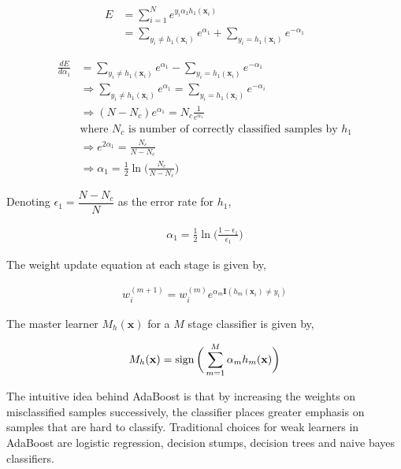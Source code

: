 \begin{align*}
E &= \sum_{i=1}^{N}e^{y_{i}\alpha_{1}h_{1}(\mathbf{x}_{i})}\\
&= \sum_{y_{i}\neq h_{1}(\mathbf{x}_{i})}e^{\alpha_{1}} + \sum_{y_{i} = h_{1}(\mathbf{x}_{i})}e^{-\alpha_{1}}
\end{align*}

\begin{align*}
\frac{dE}{d\alpha_{1}} &=  \sum_{y_{i}\neq h_{1}(\mathbf{x}_{i})}e^{\alpha_{1}} - \sum_{y_{i} = h_{1}(\mathbf{x}_{i})}e^{-\alpha_{1}} \\
&\Rightarrow \sum_{y_{i}\neq h_{1}(\mathbf{x}_{i})}e^{\alpha_{1}} = \sum_{y_{i} = h_{1}(\mathbf{x}_{i})}e^{-\alpha_{i}}\\
&\Rightarrow (N - N_{c})e^{\alpha_{1}} = N_{c}\frac{1}{e^{\alpha_{1}}}   \\
&\textrm{where $N_{c}$ is number of correctly classified samples by $h_{1}$}\\
&\Rightarrow e^{2\alpha_{1}} = \frac{N_{c}}{N - N_{c}}\\
&\Rightarrow \alpha_{1} = \frac{1}{2}\ln\bigg(\frac{N_{c}}{N-N_{c}}\bigg)
\end{align*}

Denoting $\epsilon_{1} = \dfrac{N - N_{c}}{N}$ as the error rate for $h_{1}$,

\begin{align}
\alpha_{1} = \frac{1}{2}\ln\bigg(\frac{1-\epsilon_{1}}{\epsilon_{1}}\bigg)
\label{alphas}
\end{align}

The weight update equation at each stage is given by, 

\begin{align*}
w_{i}^{(m+1)} = w_{i}^{(m)}e^{\alpha_{m}\mathbf{I}(h_{m}(\mathbf{x}_{i}) \neq y_{i})}
\end{align*}

The master learner $M_{h}(\mathbf{x})$ for a $M$ stage classifier is given by,

\begin{equation}
M_{h}(\mathbf{x}) = \operatorname{sign}\bigg( \sum_{m=1}^{M}\alpha_{m}h_{m}(\mathbf{x})\bigg)
\label{master}
\end{equation}
 
The intuitive idea behind AdaBoost is that by increasing the weights on misclassified samples successively, the classifier places greater emphasis on samples that are hard to classify. Traditional choices for weak learners in AdaBoost are logistic regression, decision stumps, decision trees and naive bayes classifiers. 

